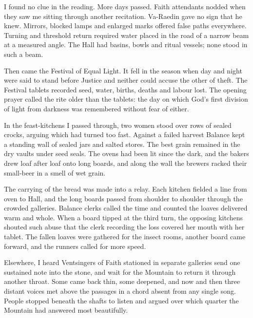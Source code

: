 I found no clue in the reading. More days passed. Faith attendants nodded when they saw me sitting through another recitation. Va-Raedin gave no sign that he knew. Mirrors, blocked lamps and enlarged marks offered false paths everywhere. Turning and threshold return required water placed in the road of a narrow beam at a measured angle. The Hall had basins, bowls and ritual vessels; none stood in such a beam.\par

\ornament

Then came the Festival of Equal Light. It fell in the season when day and night were said to stand before Justice and neither could accuse the other of theft. The Festival tablets recorded seed, water, births, deaths and labour lost. The opening prayer called the rite older than the tablets: the day on which God's first division of light from darkness was remembered without fear of either.\par

In the feast-kitchens I passed through, two women stood over rows of sealed crocks, arguing which had turned too fast. Against a failed harvest Balance kept a standing wall of sealed jars and salted stores. The best grain remained in the dry vaults under seed seals. The ovens had been lit since the dark, and the bakers drew loaf after loaf onto long boards, and along the wall the brewers racked their small-beer in a smell of wet grain.\par

The carrying of the bread was made into a relay. Each kitchen fielded a line from oven to Hall, and the long boards passed from shoulder to shoulder through the crowded galleries. Balance clerks called the time and counted the loaves delivered warm and whole. When a board tipped at the third turn, the opposing kitchens shouted such abuse that the clerk recording the loss covered her mouth with her tablet. The fallen loaves were gathered for the insect rooms, another board came forward, and the runners called for more speed.\par

Elsewhere, I heard Ventsingers of Faith stationed in separate galleries send one sustained note into the stone, and wait for the Mountain to return it through another throat. Some came back thin, some deepened, and now and then three distant voices met above the passages in a chord absent from any single song. People stopped beneath the shafts to listen and argued over which quarter the Mountain had answered most beautifully.\par

